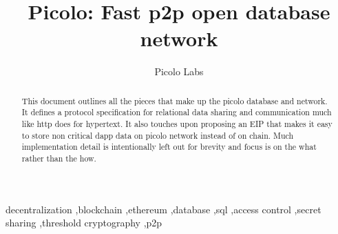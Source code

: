 \documentclass[preprint,12pt]{elsarticle}
\begin{document}
\begin{frontmatter}


\title{Picolo: Fast p2p  open database network}
\author{Picolo Labs}
\address{San Francisco, California}

\begin{abstract}
This document outlines all the pieces that make up the picolo database and network. It defines a protocol specification for relational data sharing and communication much like http does for hypertext. It also touches upon proposing an EIP that makes it easy to store non critical dapp data on picolo network instead of on chain. Much implementation detail is intentionally left out for brevity and focus is on the what rather than the how.
\end{abstract}

\begin{keyword}
decentralization \sep blockchain \sep ethereum \sep database \sep sql \sep access control \sep secret sharing \sep threshold cryptography \sep p2p
\end{keyword}

\end{frontmatter}
\setcounter{secnumdepth}{0}
\end{document}
